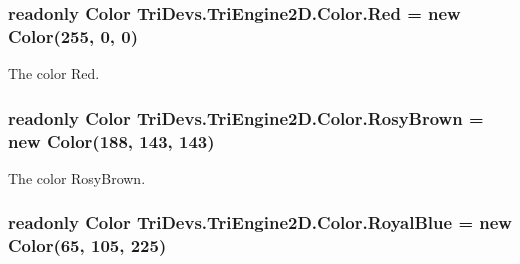 \hypertarget{struct_tri_devs_1_1_tri_engine2_d_1_1_color_ab879f9bfa08935879d4b9879dcb32495}{
\subsubsection[{Red}]{\setlength{\rightskip}{0pt plus 5cm}readonly {\bf Color} Tri\-Devs.\-Tri\-Engine2\-D.\-Color.\-Red = new {\bf Color}(255, 0, 0)\hspace{0.3cm}{\ttfamily [static]}}}\label{struct_tri_devs_1_1_tri_engine2_d_1_1_color_ab879f9bfa08935879d4b9879dcb32495}


The color Red. 

\hypertarget{struct_tri_devs_1_1_tri_engine2_d_1_1_color_a0273800b7d32bf08b982beb95f9e6dd6}{
\subsubsection[{Rosy\-Brown}]{\setlength{\rightskip}{0pt plus 5cm}readonly {\bf Color} Tri\-Devs.\-Tri\-Engine2\-D.\-Color.\-Rosy\-Brown = new {\bf Color}(188, 143, 143)\hspace{0.3cm}{\ttfamily [static]}}}\label{struct_tri_devs_1_1_tri_engine2_d_1_1_color_a0273800b7d32bf08b982beb95f9e6dd6}


The color Rosy\-Brown. 

\hypertarget{struct_tri_devs_1_1_tri_engine2_d_1_1_color_af560b006971ca8af57fa8ed0726494e2}{
\subsubsection[{Royal\-Blue}]{\setlength{\rightskip}{0pt plus 5cm}readonly {\bf Color} Tri\-Devs.\-Tri\-Engine2\-D.\-Color.\-Royal\-Blue = new {\bf Color}(65, 105, 225)\hspace{0.3cm}{\ttfamily [static]}}}\label{struct_tri_devs_1_1_tri_engine2_d_1_1_color_af560b006971ca8af57fa8ed0726494e2}


